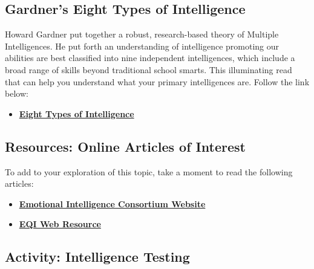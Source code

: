 \documentclass[
]{book}
\providecommand{\tightlist}{%
  \setlength{\itemsep}{0pt}\setlength{\parskip}{0pt}}
\begin{document}
\hypertarget{gardners-eight-types-of-intelligence}{%
\subsection*{Gardner's Eight Types of Intelligence}\label{gardners-eight-types-of-intelligence}}

Howard Gardner put together a robust, research-based theory of Multiple Intelligences. He put forth an understanding of intelligence promoting our abilities are best classified into nine independent intelligences, which include a broad range of skills beyond traditional school smarts. This illuminating read that can help you understand what your primary intelligences are. Follow the link below:

\begin{itemize}
\tightlist
\item
  \href{https://www.institute4learning.com/resources/articles/multiple-intelligences/}{\textbf{Eight Types of Intelligence}}
\end{itemize}

\hypertarget{resources-online-articles-of-interest-2}{%
\subsection*{Resources: Online Articles of Interest}\label{resources-online-articles-of-interest-2}}

To add to your exploration of this topic, take a moment to read the following articles:

\begin{itemize}
\item
  \href{http://www.eiconsortium.org/}{\textbf{Emotional Intelligence Consortium Website}}
\item
  \href{http://eqi.org/}{\textbf{EQI Web Resource}}
\end{itemize}

\hypertarget{activity-intelligence-testing}{%
\subsection*{Activity: Intelligence Testing}\label{activity-intelligence-testing}}
\end{document}
